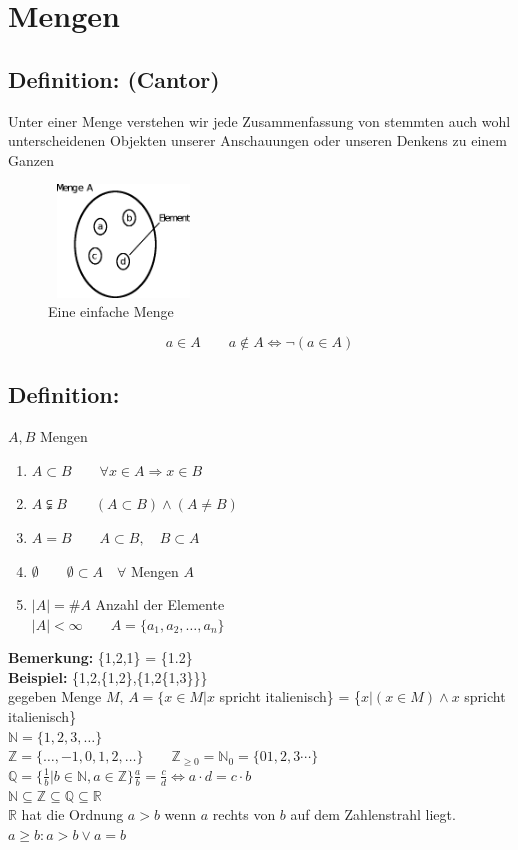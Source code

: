 \section{Mengen}
\subsection{Definition: (Cantor)}
Unter einer Menge verstehen wir jede Zusammenfassung von stemmten auch wohl unterscheidenen Objekten unserer Anschauungen oder unseren Denkens zu einem Ganzen\\

\begin{figure} [H]
\centering 
\includegraphics[width=4cm, height=3cm]{mainmatter/chapter0/pics/menge.png}
\caption{Eine einfache Menge} 
\end{figure}
\begin{equation*}
a \in A \qquad a \notin A \Leftrightarrow \neg (a \in A)
\end{equation*}
%
\subsection{Definition:}
$A, B$ Mengen 
\begin{enumerate}
\item $A \subset B \qquad \forall x \in A \Rightarrow x \in B$
\item $A \subsetneqq B \qquad (A \subset B) \wedge (A \neq B)$
\item $A = B \qquad A\subset B, \quad B\subset A$
\item $\emptyset \qquad \emptyset \subset A \quad \forall$ Mengen $A$
\item $|A| = \#A$ \qquad Anzahl der Elemente\\
 $|A| < \infty \qquad A=\{a_{1}, a_{2}, \dotsc, a_{n}\}$
\end{enumerate}
%
\textbf{Bemerkung:} \{1,2,1\} = \{1.2\}\\
\textbf{Beispiel:} \{1,2,\{1,2\},\{1,2\{1,3\}\}\}\\
gegeben Menge $M$, \quad $A=\{x \in M|x$ spricht italienisch\} = \{$x|(x \in M) \wedge x$ spricht italienisch\}\\
$\mathbb{N}=\{1,2,3, \dotsc \}$\\
$\mathbb{Z}=\{\dotsc, -1, 0, 1,2,\dotsc \} \qquad \mathbb{Z}_{\geq 0}=\mathbb{N}_{0}=\{01,2,3\cdots \}$\\
$\mathbb{Q}=\{ \frac{1}{b}|b \in \mathbb{N}, a \in \mathbb{Z}\} \frac{a}{b}=\frac{c}{d} \Leftrightarrow a \cdot d = c \cdot b$\\
$\mathbb{N}\subseteq\mathbb{Z}\subseteq\mathbb{Q}\subseteq\mathbb{R}$\\
$\mathbb{R}$ hat die Ordnung $a>b$ wenn $a$ rechts von $b$ auf dem Zahlenstrahl liegt.\\
$ a \geq b : a >b \vee a=b$\\
%
%
%
